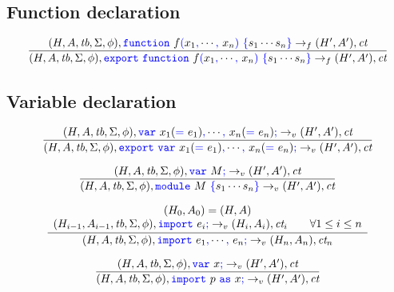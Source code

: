 \documentclass[a4paper]{article}
\newcommand{\code}[1]{\textcolor{blue}{\tt #1}}
\newcommand{\tb}{\emph{tb}}
\newcommand{\ct}{\emph{ct}}
\begin{document}
\subsection{Function declaration}
\begin{equation*}
\frac{
    (H, A, \tb, \Sigma, \phi), \code{function}\ f\code{(}x_1\code{,} \cdots \code{,}\ x_n\code{)}\ \code{\{} s_1 \cdots s_n \code{\}} \rightarrow_f (H', A'), \ct
}{
    (H, A, \tb, \Sigma, \phi), \code{export}\ \code{function}\ f\code{(}x_1\code{,} \cdots \code{,}\ x_n\code{)}\ \code{\{} s_1 \cdots s_n \code{\}} \rightarrow_f (H', A'), \ct
}
\end{equation*}

\subsection{Variable declaration}
\begin{equation*}
\frac{
    (H, A, \tb, \Sigma, \phi), \code{var}\ x_1(\code{=}\ e_1)\code{,} \cdots \code{,}\ x_n(\code{=}\ e_n)\code{;} \rightarrow_v (H', A'), \ct
}{
    (H, A, \tb, \Sigma, \phi), \code{export}\ \code{var}\ x_1(\code{=}\ e_1)\code{,} \cdots \code{,}\ x_n(\code{=}\ e_n)\code{;} \rightarrow_v (H', A'), \ct
}
\end{equation*}

\begin{equation*}
\frac{
    (H, A, \tb, \Sigma, \phi), \code{var}\ M\code{;} \rightarrow_v (H', A'), \ct
}{
    (H, A, \tb, \Sigma, \phi), \code{module}\ M\ \code{\{} s_1 \cdots s_n \code{\}} \rightarrow_v (H', A'), \ct
}
\end{equation*}

\begin{equation*}
\frac{
    \begin{array}{c}
    (H_0, A_0) = (H, A) \\
    (H_{i-1}, A_{i-1}, \tb, \Sigma, \phi), \code{import}\ e_i\code{;} \rightarrow_v (H_i, A_i), \ct_i \qquad \forall 1 \le i \le n
    \end{array}
}{
    (H, A, \tb, \Sigma, \phi), \code{import}\ e_1\code{,} \cdots \code{,}\ e_n\code{;} \rightarrow_v (H_n, A_n), \ct_n
}
\end{equation*}

\begin{equation*}
\frac{
    (H, A, \tb, \Sigma, \phi), \code{var}\ x\code{;} \rightarrow_v (H', A'), \ct
}{
    (H, A, \tb, \Sigma, \phi), \code{import}\ p\ \code{as}\ x\code{;} \rightarrow_v (H', A'), \ct
}
\end{equation*}
\end{document}
